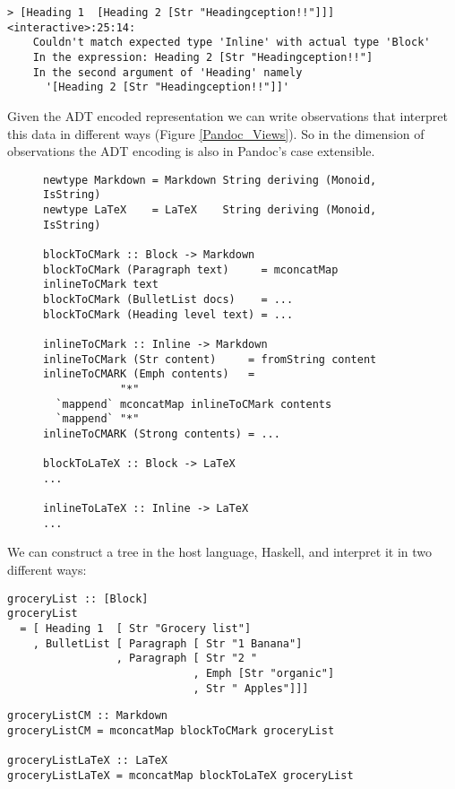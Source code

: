 \begin{lstlisting}
> [Heading 1  [Heading 2 [Str "Headingception!!"]]]
<interactive>:25:14:
    Couldn't match expected type 'Inline' with actual type 'Block'
    In the expression: Heading 2 [Str "Headingception!!"]
    In the second argument of 'Heading' namely
      '[Heading 2 [Str "Headingception!!"]]'
\end{lstlisting}

Given the ADT encoded representation we can write observations that interpret
this data in different ways (Figure \ref{Pandoc_Views}). So in the dimension of
observations the ADT encoding is also in Pandoc’s case extensible.

\begin{figure}
\begin{lstlisting}
newtype Markdown = Markdown String deriving (Monoid, IsString)
newtype LaTeX    = LaTeX    String deriving (Monoid, IsString)

blockToCMark :: Block -> Markdown
blockToCMark (Paragraph text)     = mconcatMap inlineToCMark text
blockToCMark (BulletList docs)    = ...
blockToCMark (Heading level text) = ...

inlineToCMark :: Inline -> Markdown
inlineToCMark (Str content)     = fromString content
inlineToCMARK (Emph contents)   =
            "*"
  `mappend` mconcatMap inlineToCMark contents
  `mappend` "*"
inlineToCMARK (Strong contents) = ...

blockToLaTeX :: Block -> LaTeX
...

inlineToLaTeX :: Inline -> LaTeX
...
\end{lstlisting}
\end{figure}


We can construct a tree in the host language, Haskell, and interpret it in two
different ways:
\begin{lstlisting}
groceryList :: [Block]
groceryList
  = [ Heading 1  [ Str "Grocery list"]
    , BulletList [ Paragraph [ Str "1 Banana"]
                 , Paragraph [ Str "2 "
                             , Emph [Str "organic"]
                             , Str " Apples"]]]
\end{lstlisting}

\begin{lstlisting}
groceryListCM :: Markdown
groceryListCM = mconcatMap blockToCMark groceryList

groceryListLaTeX :: LaTeX
groceryListLaTeX = mconcatMap blockToLaTeX groceryList
\end{lstlisting}

